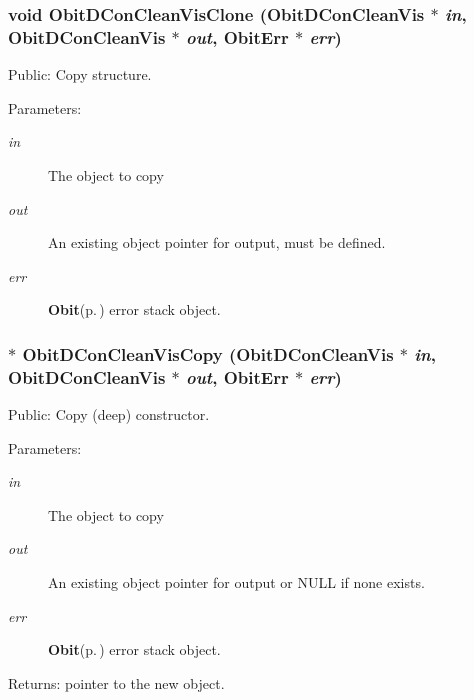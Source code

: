 \subsubsection{\setlength{\rightskip}{0pt plus 5cm}void Obit\-DCon\-Clean\-Vis\-Clone ({\bf Obit\-DCon\-Clean\-Vis} $\ast$ {\em in}, {\bf Obit\-DCon\-Clean\-Vis} $\ast$ {\em out}, {\bf Obit\-Err} $\ast$ {\em err})}\label{ObitDConCleanVis_8h_a15}


Public: Copy structure. 

\begin{Desc}
\item[Parameters:]
\begin{description}
\item[{\em in}]The object to copy \item[{\em out}]An existing object pointer for output, must be defined. \item[{\em err}]{\bf Obit}{\rm (p.\,\pageref{structObit})} error stack object. \end{description}
\end{Desc}
\subsubsection{$\ast$ Obit\-DCon\-Clean\-Vis\-Copy ({\bf Obit\-DCon\-Clean\-Vis} $\ast$ {\em in}, {\bf Obit\-DCon\-Clean\-Vis} $\ast$ {\em out}, {\bf Obit\-Err} $\ast$ {\em err})}\label{ObitDConCleanVis_8h_a14}


Public: Copy (deep) constructor. 

\begin{Desc}
\item[Parameters:]
\begin{description}
\item[{\em in}]The object to copy \item[{\em out}]An existing object pointer for output or NULL if none exists. \item[{\em err}]{\bf Obit}{\rm (p.\,\pageref{structObit})} error stack object. \end{description}
\end{Desc}
\begin{Desc}
\item[Returns:]pointer to the new object. \end{Desc}
